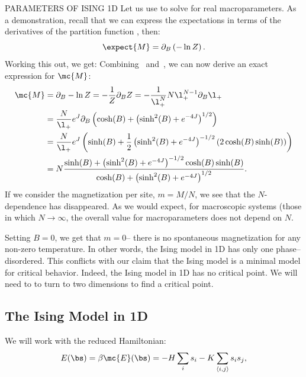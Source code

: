  PARAMETERS OF ISING 1D
Let us use  to solve for real
macroparameters. As a demonstration, recall that we can express the
expectations in terms of the derivatives of the partition function
, then:
\begin{equation}%
  \expect{M}= \partial_B \left(-\ln Z\right).
\end{equation}%
Working this out, we get:%
Combining~
and~, we can now derive an exact
expression for $\mc{M}$:
\begin{align}%
  \mc{M}&=\partial_B -\ln Z =-\frac{1}{Z}\partial_B Z=-\frac{1}{\l_+^N} N \l_+^{N-1} \partial_B \l_+\\
        &=\frac{N}{\l_+}e^J\partial_B \left( \cosh(B)+\left(\sinh^2(B)+e^{-4J}\right)^{1/2}\right)\\
        &=\frac{N}{\l_+}e^J\left( \sinh(B)+\frac{1}{2}\left(\sinh^2(B)+e^{-4J}\right)^{-1/2}\left(2\cosh(B)\sinh(B)\right)\right)\\
        &=N\frac{\sinh(B)+\left(\sinh^2(B)+e^{-4J}\right)^{-1/2}\cosh(B)\sinh(B)}
          {\cosh(B)+\left(\sinh^2(B)+e^{-4J}\right)^{1/2}}.\\
  \label{eq:ising-1d-magnetization}
\end{align}%
If we consider the magnetization per site, $m=M/N$, we see that the
$N$-dependence has disappeared. As we would expect, for macroscopic
systems (those in which $N\rightarrow \infty$, the overall value for
macroparameters does not depend on $N$. %

Setting $B=0$, we get that $m=0$-- there is no spontaneous
magnetization for any non-zero temperature. In other words, the Ising
model in 1D has only one phase-- disordered. This conflicts with our
claim that the Ising model is a minimal model for critical
behavior. Indeed, the Ising model in 1D has no critical point. We will
need to to turn to two dimensions to find a critical point.

\subsection{The Ising Model in 1D}\label{sec:decimation}

We will work with the reduced Hamiltonian:
\begin{equation}%
  E(\bs)=\beta \mc{E}(\bs)=-H \sum_i s_i-K \sum_{\langle i,j\rangle} s_i s_j,
\end{equation}%


